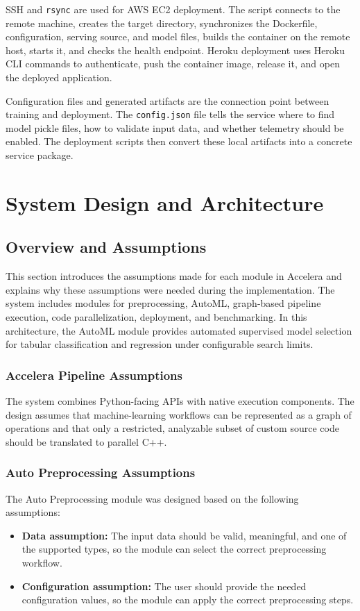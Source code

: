 \documentclass[12pt,a4paper]{report}
\begin{document}
SSH and \texttt{rsync} are used for AWS EC2 deployment. The script connects to
the remote machine, creates the target directory, synchronizes the Dockerfile,
configuration, serving source, and model files, builds the container on the
remote host, starts it, and checks the health endpoint. Heroku deployment uses
Heroku CLI commands to authenticate, push the container image, release it, and
open the deployed application.

Configuration files and generated artifacts are the connection point between
training and deployment. The \texttt{config.json} file tells the service where
to find model pickle files, how to validate input data, and whether telemetry
should be enabled. The deployment scripts then convert these local artifacts
into a concrete service package.


\chapter{System Design and Architecture}
\section{Overview and Assumptions}
This section introduces the assumptions made for each module in Accelera and
explains why these assumptions were needed during the implementation.
The system includes modules for preprocessing, AutoML, graph-based pipeline
execution, code parallelization, deployment, and benchmarking. In this
architecture, the AutoML module provides automated supervised model selection
for tabular classification and regression under configurable search limits.
\subsection{Accelera Pipeline Assumptions}
The system combines Python-facing APIs with native execution components. The
design assumes that machine-learning workflows can be represented as a graph
of operations and that only a restricted, analyzable subset of custom source
code should be translated to parallel C++.
\subsection{Auto Preprocessing Assumptions}

The Auto Preprocessing module was designed based on the following assumptions:

\begin{itemize}
  \item \textbf{Data assumption:} The input data should be valid, meaningful,
  and one of the supported types, so the module can select the correct
  preprocessing workflow.

  \item \textbf{Configuration assumption:} The user should provide the needed
  configuration values, so the module can apply the correct preprocessing steps.
\end{itemize}
\end{document}
